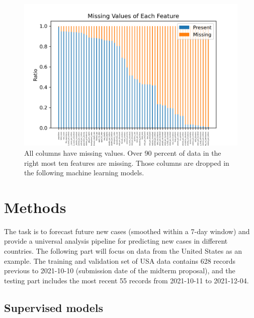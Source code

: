 \documentclass[11pt]{article}
\begin{document}
\begin{figure}[htb]
	\setlength{\abovecaptionskip}{0.5cm}
	\centering
	\includegraphics[width=0.6\linewidth]{../figures/missingvalues.png} %
	\caption{All columns have missing values. Over 90 percent of data in the right most ten features are missing. Those columns are dropped in the following machine learning models.}
\end{figure}



\section{Methods}
The task is to forecast future new cases (smoothed within a 7-day window) and provide a universal analysis pipeline for predicting new cases in different countries. The following part will focus on data from the United States as an example. The training and validation set of USA data contains 628 records previous to 2021-10-10 (submission date of the midterm proposal), and the testing part includes the most recent 55 records from 2021-10-11 to 2021-12-04.

\subsection{Supervised models}
\end{document}
